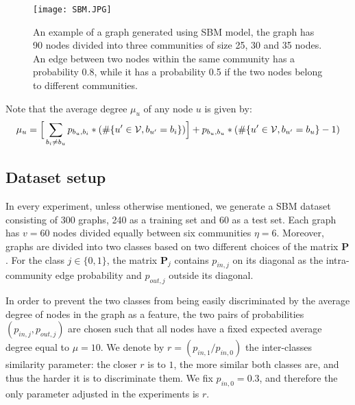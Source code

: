 \begin{figure}[H]
\centering
\texttt{[image: SBM.JPG]}
\caption[Visualization of an SBM-based graph example]{An example of a graph generated using SBM model, the graph has 90 nodes divided into three communities of size 25, 30 and 35 nodes. An edge between two nodes within the same community has a probability 0.8, while it has a probability 0.5 if the two nodes belong to different communities.}
\label{fig:SBM_example}
\end{figure}

Note that the average degree $\mu_u$ of any node $u$ is given by:
\begin{equation}
    \mu_u=\Big[\sum_{b_i\neq b_u} p_{b_u,b_i}*(\#\{ u'\in \mathcal{V}, b_{u'}=b_i \} )\Big]+p_{b_u,b_u}*(\#\{u'\in \mathcal{V}, b_{u'}=b_u \}-1 )
\end{equation}

\subsection{Dataset setup}

In every experiment, unless otherwise mentioned, we generate a SBM dataset consisting of 300 graphs, 240 as a training set and 60 as a test set. Each graph has $v=60$ nodes divided equally between six communities $\eta=6$. Moreover, graphs are divided into two classes based on two different choices of the matrix $\mathbf{P}$. For the class $j\in\{0,1\}$, the matrix $\mathbf{P}_j$ contains $p_{in,j}$ on its diagonal as the intra-community edge probability and $p_{out,j}$ outside its diagonal.

In order to prevent the two classes from being easily discriminated by the average degree of nodes in the graph as a feature, the two pairs of probabilities $(p_{in,j}, p_{out,j})$ are chosen such that all nodes have a fixed expected average degree equal to $\mu=10$. We denote by $r=(p_{in,1}/p_{in,0})$ the inter-classes similarity parameter: the closer $r$ is to $1$, the more similar both classes are, and thus the harder it is to discriminate them. We fix $p_{in,0} = 0.3$, and therefore the only parameter adjusted in the experiments is $r$.

